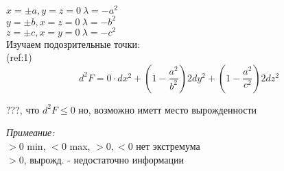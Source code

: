 \documentclass{article}
\begin{document}
\(x = \pm a, y = z = 0\ \lambda = -a^2\) \\
\(y = \pm b, x = z = 0\ \lambda = -b^2\) \\
\(z = \pm c, x = y = 0\ \lambda = -c^2\) \\

Изучаем подозрительные точки: \\
(ref:1) \[ d^2F = 0 \cdot dx^2 + (1 - \frac{a^2}{b^2})2dy^2 + (1 - \frac{a^2}{c^2})2dz^2 \]

???, что \(d^2F \le 0\) но, возможно иметт место вырожденности

\emph{Примеание:} \\
\(> 0\) min, \(< 0\) max, \(> 0, < 0\) нет экстремума \\
\(> 0\), вырожд. - недостаточно информации
\end{document}
